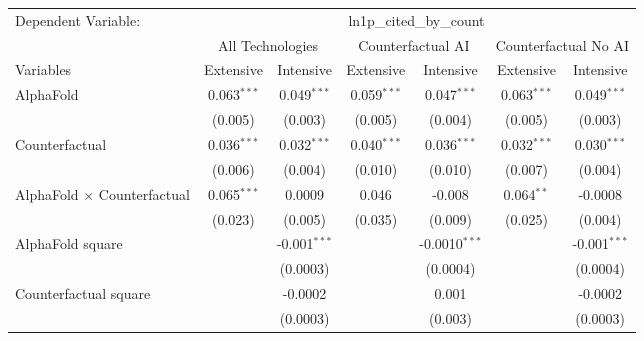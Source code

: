 \begingroup
\centering
\begin{tabular}{lcccccc}
   \tabularnewline \midrule \midrule
   Dependent Variable: & \multicolumn{6}{c}{ln1p\_cited\_by\_count}\\
 & \multicolumn{2}{c}{All Technologies} & \multicolumn{2}{c}{Counterfactual AI} & \multicolumn{2}{c}{Counterfactual No AI} \\
\cmidrule(lr){1-1}\cmidrule(lr){2-3} \cmidrule(lr){4-5} \cmidrule(lr){6-7}
Variables & \multicolumn{1}{c}{Extensive} & \multicolumn{1}{c}{Intensive} & \multicolumn{1}{c}{Extensive} & \multicolumn{1}{c}{Intensive} & \multicolumn{1}{c}{Extensive} & \multicolumn{1}{c}{Intensive} \\
\cmidrule(lr){1-1}\cmidrule(lr){2-2} \cmidrule(lr){3-3} \cmidrule(lr){4-4} \cmidrule(lr){5-5} \cmidrule(lr){6-6} \cmidrule(lr){7-7}
   AlphaFold                          & 0.063$^{***}$ & 0.049$^{***}$  & 0.059$^{***}$ & 0.047$^{***}$   & 0.063$^{***}$ & 0.049$^{***}$\\   
                                      & (0.005)       & (0.003)        & (0.005)       & (0.004)         & (0.005)       & (0.003)\\   
   Counterfactual                     & 0.036$^{***}$ & 0.032$^{***}$  & 0.040$^{***}$ & 0.036$^{***}$   & 0.032$^{***}$ & 0.030$^{***}$\\   
                                      & (0.006)       & (0.004)        & (0.010)       & (0.010)         & (0.007)       & (0.004)\\   
   AlphaFold $\times$ Counterfactual  & 0.065$^{***}$ & 0.0009         & 0.046         & -0.008          & 0.064$^{**}$  & -0.0008\\   
                                      & (0.023)       & (0.005)        & (0.035)       & (0.009)         & (0.025)       & (0.004)\\   
   AlphaFold square                   &               & -0.001$^{***}$ &               & -0.0010$^{***}$ &               & -0.001$^{***}$\\   
                                      &               & (0.0003)       &               & (0.0004)        &               & (0.0004)\\   
   Counterfactual square              &               & -0.0002        &               & 0.001           &               & -0.0002\\   
                                      &               & (0.0003)       &               & (0.003)         &               & (0.0003)\\   

\end{tabular}
